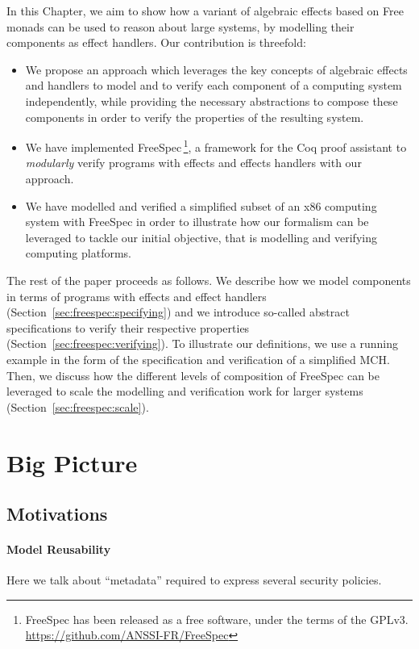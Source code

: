 In this Chapter, we aim to show how a variant of algebraic effects based on Free
monads can be used to reason about large systems, by modelling their components
as effect handlers.
%
Our contribution is threefold:
\begin{itemize}
\item We propose an approach which leverages the key concepts of algebraic
  effects and handlers to model and to verify each component of a computing
  system independently, while providing the necessary abstractions to compose
  these components in order to verify the properties of the resulting system.
%
\item We have implemented FreeSpec\,\footnote{FreeSpec has been released as a
    free software, under the terms of the GPLv3.
    \url{https://github.com/ANSSI-FR/FreeSpec}}, a framework for the Coq proof
  assistant to \emph{modularly} verify programs with effects and effects
  handlers with our approach.
%
\item We have modelled and verified a simplified subset of an x86 computing
  system with FreeSpec in order to illustrate how our formalism can be leveraged
  to tackle our initial objective, that is modelling and verifying computing
  platforms.
\end{itemize}

The rest of the paper proceeds as follows.
%
We describe how we model components in terms of programs with effects and effect
handlers (Section~\ref{sec:freespec:specifying}) and we introduce so-called
abstract specifications to verify their respective properties
(Section~\ref{sec:freespec:verifying}).
%
To illustrate our definitions, we use a running example in the form of the
specification and verification of a simplified MCH.
%
Then, we discuss how the different levels of composition of FreeSpec can be
leveraged to scale the modelling and verification work for larger systems
(Section~\ref{sec:freespec:scale}).

\section{Big Picture}


\subsection{Motivations}

\paragraph{Model Reusability}
%
Here we talk about ``metadata'' required to express several security policies.

